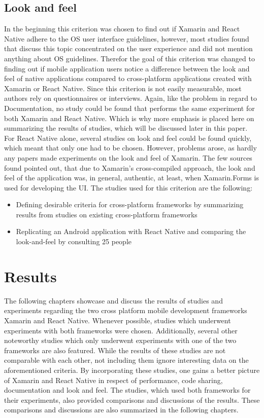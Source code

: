 \documentclass[Bachelor,BIF,english]{twbook}
\begin{document}
\subsection{Look and feel}
In the beginning this criterion was chosen to find out if Xamarin and React Native adhere to the OS user interface guidelines, however, most studies found that discuss this topic concentrated on the user experience and did not mention anything about OS guidelines. Therefor the goal of this criterion was changed to finding out if mobile application users notice a difference between the look and feel of native applications compared to cross-platform applications created with Xamarin or React Native. Since this criterion is not easily measurable, most authors rely on questionnaires or interviews. Again, like the problem in regard to Documentation, no study could be found that performs the same experiment for both Xamarin and React Native. Which is why more emphasis is placed here on summarizing the results of studies, which will be discussed later in this paper. For React Native alone, several studies on look and feel could be found quickly, which meant that only one had to be chosen. However, problems arose, as hardly any papers made experiments on the look and feel of Xamarin. The few sources found pointed out, that due to Xamarin's cross-compiled approach, the look and feel of the application was, in general, authentic, at least, when Xamarin.Forms is used for developing the UI. The studies used for this criterion are the following:
\begin{itemize}
\item Defining desirable criteria for cross-platform frameworks by summarizing results from studies on existing cross-platform frameworks\cite[p.~21]{GaouarBenamarBendimerad2016} \cite[p.~8]{tunali2015comparison}
\item Replicating an Android application with React Native and comparing the look-and-feel by consulting 25 people \cite[p.~16-18]{Danielsson_2016}
\end{itemize}

\section{Results}
The following chapters showcase and discuss the results of studies and experiments regarding the two cross platform mobile development frameworks Xamarin and React Native. Whenever possible, studies which underwent experiments with both frameworks were chosen. Additionally, several other noteworthy studies which only underwent experiments with one of the two frameworks are also featured. While the results of these studies are not comparable with each other, not including them ignore interesting data on the aforementioned criteria. By incorporating these studies, one gains a better picture of Xamarin and React Native in respect of performance, code sharing, documentation and look and feel. The studies, which used both frameworks for their experiments, also provided comparisons and discussions of the results. These comparisons and discussions are also summarized in the following chapters.
\end{document}

